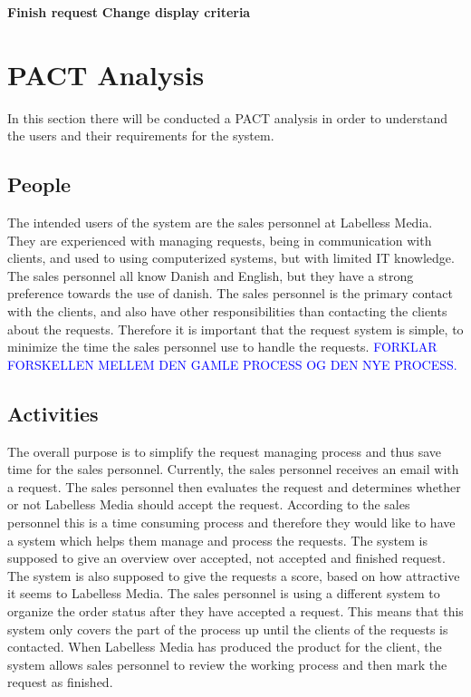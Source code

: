 \textbf{Finish request}
\textbf{Change display criteria}

\section{PACT Analysis}
In this section there will be conducted a PACT analysis in order to understand the users and their requirements for the system.

\subsection{People}
The intended users of the system are the sales personnel at Labelless Media. They are experienced with managing requests, being in communication with clients, and used to using computerized systems, but with limited IT knowledge. The sales personnel all know Danish and English, but they have a strong preference towards the use of danish. The sales personnel is the primary contact with the clients, and also have other responsibilities than contacting the clients about the requests. Therefore it is important that the request system is simple, to minimize the time the sales personnel use to handle the requests. 
\newline \noindent
\textcolor{blue}{FORKLAR FORSKELLEN MELLEM DEN GAMLE PROCESS OG DEN NYE PROCESS.}


\subsection{Activities}
The overall purpose is to simplify the request managing process and thus save time for the sales personnel. Currently, the sales personnel receives an email with a request. The sales personnel then evaluates the request and determines whether or not Labelless Media should accept the request. According to the sales personnel this is a time consuming process and therefore they would like to have a system which helps them manage and process the requests. The system is supposed to give an overview over accepted, not accepted and finished request. The system is also supposed to give the requests a score, based on how attractive it seems to Labelless Media. The sales personnel is using a different system to organize the order status after they have accepted a request. This means that this system only covers the part of the process up until the clients of the requests is contacted. When Labelless Media has produced the product for the client, the system allows sales personnel to review the working process and then mark the request as finished.

